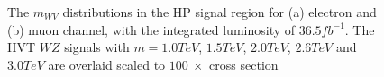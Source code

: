\begin{figure}[h]
	\begin{center}
	\end{center}
	\caption{The $m_{WV}$ distributions in the HP signal region for (a) electron and (b) muon channel, with the integrated luminosity of $36.5fb^{-1}$. The HVT $WZ$ signals with $m=1.0TeV$, $1.5TeV$, $2.0TeV$, $2.6TeV$ and $3.0TeV$ are overlaid scaled to $100 ~\times$ cross section}
	\label{Fig:HighPuritySR}
\end{figure}

